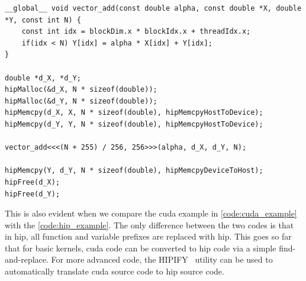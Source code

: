 \begin{listing}
    \begin{verbatim}
__global__ void vector_add(const double alpha, const double *X, double *Y, const int N) {
    const int idx = blockDim.x * blockIdx.x + threadIdx.x;
    if(idx < N) Y[idx] = alpha * X[idx] + Y[idx];
}
    
double *d_X, *d_Y;
hipMalloc(&d_X, N * sizeof(double));
hipMalloc(&d_Y, N * sizeof(double));
hipMemcpy(d_X, X, N * sizeof(double), hipMemcpyHostToDevice);
hipMemcpy(d_Y, Y, N * sizeof(double), hipMemcpyHostToDevice);

vector_add<<<(N + 255) / 256, 256>>>(alpha, d_X, d_Y, N);

hipMemcpy(Y, d_Y, N * sizeof(double), hipMemcpyDeviceToHost);
hipFree(d_X);
hipFree(d_Y);
    \end{verbatim}
    \caption{%
    A simple DAXPY example using \gls{hip} including all necessary memory and kernel launch operations.
    }
    \label{code:hip_example}
\end{listing}

This is also evident when we compare the \gls{cuda} example in \autoref{code:cuda_example} with the \autoref{code:hip_example}. 
The only difference between the two codes is that in \gls{hip}, all  function and variable prefixes are replaced with \gls{hip}. 
This goes so far that for basic kernels, \gls{cuda} code can be converted to \gls{hip} code via a simple find-and-replace. 
For more advanced code, the HIPIFY~\cite{advanced_micro_devices_rocmhipify_2025} utility can be used to automatically translate \gls{cuda} source code to \gls{hip} source code. 


